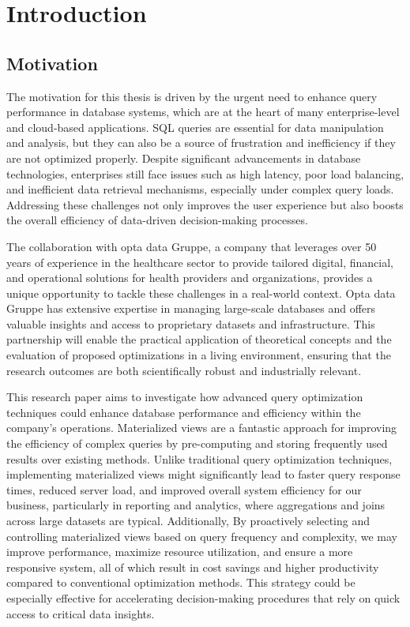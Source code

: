 \section{Introduction}
\subsection{Motivation}
The motivation for this thesis is driven by the urgent need to enhance query performance in database systems, which are at the heart of many enterprise-level and cloud-based applications. SQL queries are essential for data manipulation and analysis, but they can also be a source of frustration and inefficiency if they are not optimized properly. Despite significant advancements in database technologies, enterprises still face issues such as high latency, poor load balancing, and inefficient data retrieval mechanisms, especially under complex query loads. Addressing these challenges not only improves the user experience but also boosts the overall efficiency of data-driven decision-making processes.

The collaboration with opta data Gruppe, a company that leverages over 50 years of experience in the healthcare sector to provide tailored digital, financial, and operational solutions for health providers and organizations, provides a unique opportunity to tackle these challenges in a real-world context. Opta data Gruppe has extensive expertise in managing large-scale databases and offers valuable insights and access to proprietary datasets and infrastructure. This partnership will enable the practical application of theoretical concepts and the evaluation of proposed optimizations in a living environment, ensuring that the research outcomes are both scientifically robust and industrially relevant.

This research paper aims to investigate how advanced query optimization techniques could enhance database performance and efficiency within the company's operations. Materialized views are a fantastic approach for improving the efficiency of complex queries by pre-computing and storing frequently used results over existing methods. Unlike traditional query optimization techniques, implementing materialized views might significantly lead to faster query response times, reduced server load, and improved overall system efficiency for our business, particularly in reporting and analytics, where aggregations and joins across large datasets are typical. Additionally, By proactively selecting and controlling materialized views based on query frequency and complexity, we may improve performance, maximize resource utilization, and ensure a more responsive system, all of which result in cost savings and higher productivity compared to conventional optimization methods. This strategy could be especially effective for accelerating decision-making procedures that rely on quick access to critical data insights.

